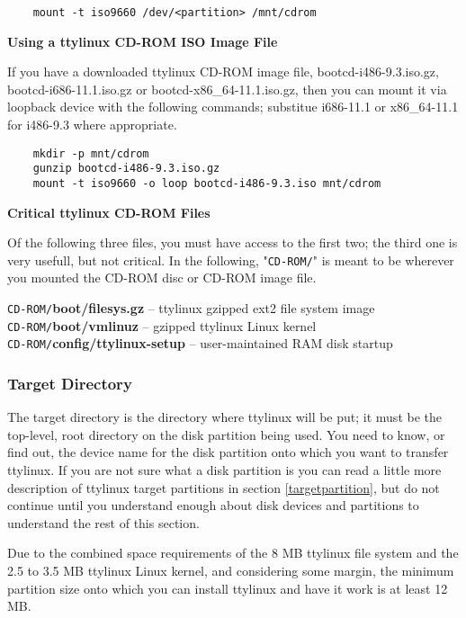 \documentclass[10pt]{article}
\begin{document}
\begin{lstlisting}
	mount -t iso9660 /dev/<partition> /mnt/cdrom
\end{lstlisting}

{\bf Using a ttylinux CD-ROM ISO Image File}

If you have a downloaded ttylinux CD-ROM image file, bootcd-i486-9.3.iso.gz,
bootcd-i686-11.1.iso.gz or bootcd-x86\_64-11.1.iso.gz, then you can mount it
via loopback device with the following commands; substitue i686-11.1 or
x86\_64-11.1 for i486-9.3 where appropriate.

\begin{lstlisting}
	mkdir -p mnt/cdrom
	gunzip bootcd-i486-9.3.iso.gz
	mount -t iso9660 -o loop bootcd-i486-9.3.iso mnt/cdrom
\end{lstlisting}

{\bf Critical ttylinux CD-ROM Files}

Of the following three files, you must have access to the first two; the third
one is very usefull, but not critical. In the following, "{\tt CD-ROM/}" is
meant to be wherever you mounted the CD-ROM disc or CD-ROM image file.

{\tt CD-ROM/}{\bf boot/filesys.gz} -- ttylinux gzipped ext2 file system image\\
{\tt CD-ROM/}{\bf boot/vmlinuz} -- gzipped ttylinux Linux kernel\\
{\tt CD-ROM/}{\bf config/ttylinux-setup} -- user-maintained RAM disk startup

\subsubsection{Target Directory}

The target directory is the directory where ttylinux will be put; it must be
the top-level, root directory on the disk partition being used. You need to
know, or find out, the device name for the disk partition onto which you want
to transfer ttylinux. If you are not sure what a disk partition is you can read
a little more description of ttylinux target partitions in section
\ref{targetpartition}, but do not continue until you understand enough about
disk devices and partitions to understand the rest of this section.

Due to the combined space requirements of the 8 MB ttylinux file system and the
2.5 to 3.5 MB ttylinux Linux kernel, and considering some margin, the minimum
partition size onto which you can install ttylinux and have it work is at least
12 MB.
\end{document}
